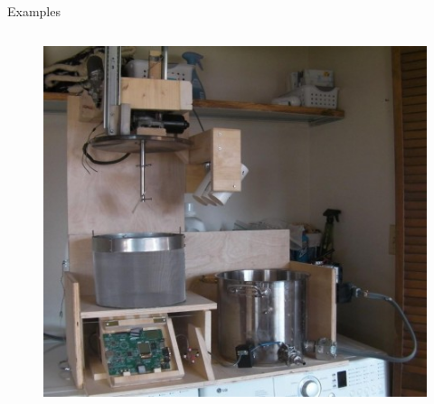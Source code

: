 \documentclass{beamer}
\begin{document}
\begin{frame}{Examples}
\begin{columns}
\begin{column}[r]{0.5\textwidth}
\begin{itemize}
\end{itemize}
\vfill
\begin{figure}
\includegraphics[width=0.8\columnwidth]{figures/brewery.jpg}
\end{figure}
\end{column}
\end{columns}
\end{frame}
\end{document}
